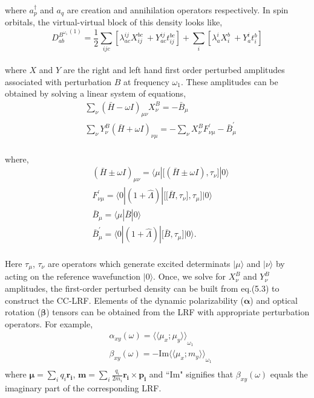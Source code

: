 \\
where $a^{\dagger}_{p}$ and $a_q$ are creation and annihilation operators respectively. 
In spin orbitals, the virtual-virtual block of this density looks like,
\\
\begin{equation}
{D^{B^{\omega_1}}_{ab}}^{(1)}= \frac{1}{2}\sum_{ijc}[\lambda^{ij}_{ac}X^{bc}_{ij} \
+ Y^{ij}_{ac}t^{bc}_{ij}] + \sum_i[\lambda^{i}_{a}X^{b}_{i}\
+ Y^{i}_{a}t^{b}_{i}] 
\end{equation}
\\
where $X$ and $Y$ are the right and left hand first order perturbed amplitudes associated with 
perturbation $B$ at frequency $\omega_1$. These amplitudes can be obtained 
by solving a linear system of equations,  
\\
\begin{equation}
\begin{split}
& \sum_\nu{(\bar{H} - \omega I)}_{\mu\nu}X_{\nu}^{B} = -\bar{B}_{\mu} \\
&\sum_\nu Y_{\nu}^{B}{(\bar{H} + \omega I)}_{\nu\mu}
= -  \sum_\nu X_{\nu}^{B} F^{'}_{\nu\mu} - \bar{B}^{'}_{\mu}
\end{split}
\end{equation}
\\
where,
\begin{equation}
\begin{split}
&{(\bar{H} \pm \omega I)}_{\mu\nu} = \langle \mu | \big[(\bar{H} \pm \omega I),\tau_\nu\big] |0\rangle\\
&F^{'}_{\nu\mu} = \langle 0|(1 + \hat{\Lambda})|\big[\big[\bar{H},\tau_\nu\big],\tau_\mu\big] |0 \rangle\\ 
&\bar{B}_{\mu} = \langle \mu|\bar{B}|0 \rangle \\
& \bar{B}^{'}_{\mu} = \langle 0|(1 + \hat{\Lambda})|\big[\bar{B},\tau_\mu\big] |0 \rangle.
\end{split}
\end{equation}
\\
Here $\tau_\mu$, $\tau_\nu$ are operators which generate excited determinats $|\mu\rangle$
and $|\nu\rangle$ by acting on the reference wavefunction $|0\rangle$. Once, we solve for 
$X_{\nu}^{B}$ and $Y_{\nu}^{B}$ amplitudes, the first-order perturbed density can be built 
from eq.(5.3) to construct the CC-LRF. Elements of the dynamic polarizability ($\bm{\alpha}$) 
and optical rotation ($\bm{\beta}$) tensors can be obtained from the LRF with appropriate 
perturbation operators. For example,
\begin{equation}
\begin{split}
& \alpha_{xy}(\omega) = {\langle\langle \mu_x;\mu_y\rangle\rangle}_{\omega_1}\\
&\beta_{xy}(\omega) = {-\text{Im} \langle\langle \mu_x;m_y\rangle\rangle}_{\omega_1} \\
\end{split}
\end{equation}
where $\bm{\mu} = \sum_i q_i \bm{r_i} $, $\bm{m} = \sum_i \frac{q_i}{2m_i} \bm{r_i} \times \bm{p_i}$
and ``Im" signifies that $\beta_{xy}(\omega)$ equals the imaginary part of the corresponding LRF.
